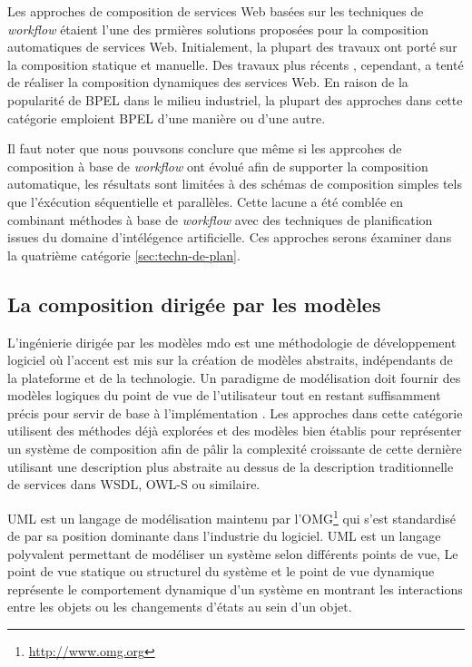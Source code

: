   Les approches de composition de services Web basées sur les
  techniques de \textit{workflow} étaient l'une des prmières solutions
  proposées pour la composition automatiques de services
  Web. Initialement, la plupart des travaux ont porté sur la
  composition statique et manuelle. Des travaux plus récents
  \cite{majithia2004framework, ardagna2007paws, fujii2006semantics,
    fujii2009semantics}, cependant, a tenté de réaliser la composition
  dynamiques des services Web. En raison de la popularité de
  \textsc{BPEL} dans le milieu industriel, la plupart des approches
  dans cette catégorie emploient \textsc{BPEL} d'une manière ou d'une
  autre.\medskip

  Il faut noter que nous pouvsons conclure que même si les apprcohes
  de composition à base de \textit{workflow} ont évolué afin de
  supporter la composition automatique, les résultats sont limitées à
  des schémas de composition simples tels que l'éxécution séquentielle
  et parallèles. Cette lacune a été comblée en combinant méthodes à
  base de \textit{workflow} avec des techniques de planification
  issues du domaine d'intélégence artificielle. Ces approches serons
  éxaminer dans la quatrième catégorie \ref{sec:techn-de-plan}.

  \subsection{La composition dirigée par les modèles}
  \label{sec:model-based-composition}
  L'ingénierie dirigée par les modèles \acrshort{mdo} est une
  méthodologie de développement logiciel où l'accent est mis sur la
  création de modèles abstraits, indépendants de la plateforme et de
  la technologie. Un paradigme de modélisation doit fournir des
  modèles logiques du point de vue de l'utilisateur tout en restant
  suffisamment précis pour servir de base à l'implémentation
  \cite{dumez2010approche}. Les approches dans cette catégorie
  utilisent des méthodes déjà explorées et des modèles bien établis
  pour représenter un système de composition afin de pâlir la
  complexité croissante de cette dernière utilisant une description
  plus abstraite au dessus de la description traditionnelle de
  services dans \textsc{WSDL}, \textsc{OWL-S} ou similaire.\medskip

  \textsc{UML} \cite{rumbaugh2004unified} est un langage de
  modélisation maintenu par
  l'\textsc{OMG}\footnote{\url{http://www.omg.org}} qui s'est
  standardisé de par sa position dominante dans l'industrie du
  logiciel. \textsc{UML} est un langage polyvalent permettant de
  modéliser un système selon différents points de vue, Le point de vue
  statique ou structurel du système et le point de vue dynamique
  représente le comportement dynamique d'un système en montrant les
  interactions entre les objets ou les changements d'états au sein
  d'un objet.\medskip

